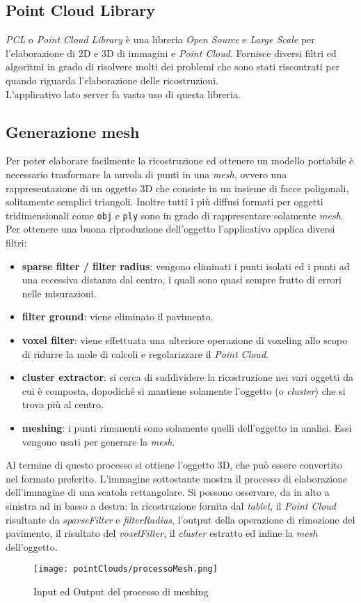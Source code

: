 \subsection{Point Cloud Library}
\emph{PCL} o \emph{Point Cloud Library} è una libreria \emph{Open Source} e \emph{Large Scale} per l'elaborazione di 2D e 3D di immagini e \emph{Point Cloud}. Fornisce diversi filtri ed algoritmi in grado di risolvere molti dei problemi che sono stati riscontrati per quando riguarda l'elaborazione delle ricostruzioni.\\
L'applicativo lato server fa vasto uso di questa libreria.
\subsection{Generazione mesh}
Per poter elaborare facilmente la ricostruzione ed ottenere un modello portabile è necessario trasformare la nuvola di punti in una \emph{mesh}, ovvero una rappresentazione di un oggetto 3D che consiste in un insieme di facce poligonali, solitamente semplici triangoli. Inoltre tutti i più diffusi formati per oggetti tridimensionali come \texttt{obj} e \texttt{ply} sono in grado di rappresentare solamente \emph{mesh}.\\
Per ottenere una buona riproduzione dell'oggetto l'applicativo applica diversi filtri:
\begin{itemize}
	\item \textbf{sparse filter / filter radius}: vengono eliminati i punti isolati ed i punti ad una eccessiva distanza dal centro, i quali sono quasi sempre frutto di errori nelle misurazioni.
	\item \textbf{filter ground}: viene eliminato il pavimento.
	\item \textbf{voxel filter}: viene effettuata una ulteriore operazione di voxeling allo scopo di ridurre la mole di calcoli e regolarizzare il \emph{Point Cloud}.
	\item \textbf{cluster extractor}: si cerca di suddividere la ricostruzione nei vari oggetti da cui è composta, dopodiché si mantiene solamente l'oggetto (o \emph{cluster}) che si trova più al centro.
	\item \textbf{meshing}: i punti rimanenti sono solamente quelli dell'oggetto in analisi. Essi vengono usati per generare la \emph{mesh}.
\end{itemize}
Al termine di questo processo si ottiene l'oggetto 3D, che può essere convertito nel formato preferito. L'immagine sottostante mostra il processo di elaborazione dell'immagine di una scatola rettangolare. Si possono osservare, da in alto a sinistra ad in basso a destra: la ricostruzione fornita dal \emph{tablet}, il \emph{Point Cloud} risultante da \emph{sparseFilter} e \emph{filterRadius}, l'output della operazione di rimozione del pavimento, il risultato del \emph{voxelFilter}, il \emph{cluster} estratto ed infine la \emph{mesh} dell'oggetto.
\begin{figure}[!h] 
    \centering 
    \texttt{[image: pointClouds/processoMesh.png]} 
    \caption{Input ed Output del processo di meshing}
\end{figure}

